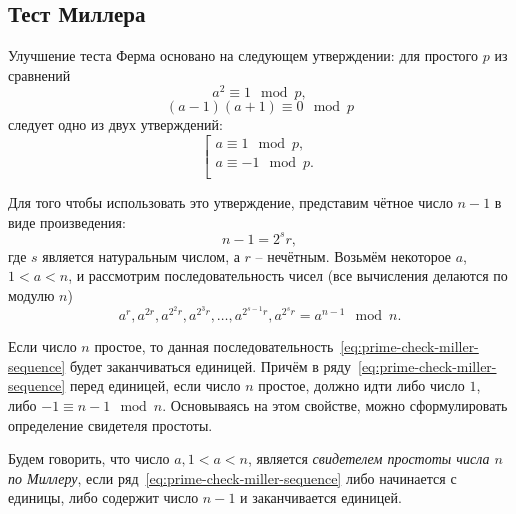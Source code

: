 \subsection{Тест Миллера}\label{section-prime-check-miller}

Улучшение теста Ферма основано на следующем утверждении: для простого $p$ из сравнений
    \[ a^2 \equiv 1 \mod p, \]
    \[ (a-1)(a+1) \equiv 0 \mod p \]
следует одно из двух утверждений: 
\[ \left[ \begin{array}{l}
     a \equiv 1 \mod p, \\
     a \equiv -1 \mod p. \\
\end{array} \right. \]

Для того чтобы использовать это утверждение, представим чётное число $n - 1$ в виде произведения:
    \[ n-1 = 2^s r, \]
где $s$ является натуральным числом, а $r$ -- нечётным. Возьмём некоторое $a$, $1 < a < n$, и рассмотрим последовательность чисел (все вычисления делаются по модулю $n$)
\begin{equation}\label{eq:prime-check-miller-sequence}
	a^{r}, a^{2r}, a^{2^2 r}, a^{2^3 r}, \dots, a^{2^{s-1} r}, a^{2^s r} = a^{n-1} \mod n.
\end{equation}

Если число $n$ простое, то данная последовательность~\ref{eq:prime-check-miller-sequence} будет заканчиваться единицей. Причём в ряду~\ref{eq:prime-check-miller-sequence} перед единицей, если число $n$ простое, должно идти либо число $1$, либо $-1 \equiv n-1 \mod n$. Основываясь на этом свойстве, можно сформулировать определение свидетеля простоты.

Будем говорить, что число $a, 1 < a < n$, является \emph{свидетелем простоты числа $n$ по Миллеру}, если ряд~\ref{eq:prime-check-miller-sequence} либо начинается с единицы, либо содержит число $n-1$ и заканчивается единицей.

